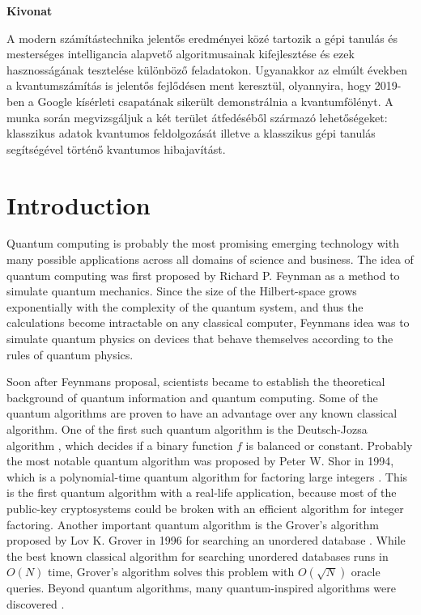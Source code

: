\documentclass[12pt, a4paper,  nobibnotes]{article}
\begin{document}
\begin{center}
    \textbf{Kivonat}\\
    \par A modern számítástechnika jelentős eredményei közé tartozik a gépi
    tanulás és mesterséges intelligancia alapvető algoritmusainak kifejlesztése és ezek 
    hasznosságának tesztelése különböző feladatokon. Ugyanakkor az elmúlt években a 
    kvantumszámítás is jelentős fejlődésen ment keresztül, olyannyira, hogy 2019-ben a Google kísérleti
    csapatának sikerült demonstrálnia a kvantumfölényt. A munka során megvizsgáljuk a két terület átfedéséből 
    származó lehetőségeket: klasszikus adatok kvantumos feldolgozását illetve a klasszikus
    gépi tanulás segítségével történő kvantumos hibajavítást.
\end{center}
\thispagestyle{empty} %
\newpage

\thispagestyle{empty}
\tableofcontents
\newpage

\thispagestyle{empty}
\listoffigures
\newpage

\section{Introduction}
Quantum computing is probably the most promising emerging technology with many possible applications across
all domains of science and business. The idea of quantum computing was first proposed by Richard P. Feynman
as a method to simulate quantum mechanics. Since the size of the Hilbert-space grows exponentially with
the complexity of the quantum system, and thus the calculations become intractable on any classical
computer, Feynmans idea was to simulate quantum physics on devices that behave themselves according to 
the rules of quantum physics.
\par
Soon after Feynmans proposal, scientists became to establish the theoretical background of quantum
information and quantum computing. Some of the quantum algorithms are proven to have an 
advantage over any known classical algorithm. One of the first such quantum algorithm is 
the Deutsch-Jozsa algorithm \cite{DeutschJozsa1992}, which decides if a binary function $f$ 
is balanced or constant. Probably the most notable quantum algorithm was proposed by Peter W. Shor 
in 1994, which is a polynomial-time quantum algorithm for factoring large integers \cite{Shor1994}.
This is the first quantum algorithm with a real-life application, because most of the public-key
cryptosystems could be broken with an efficient algorithm for integer factoring. 
Another important quantum algorithm is the Grover's algorithm proposed by Lov K. Grover in 1996 for
searching an unordered database \cite{Grover1996}. While the best known classical algorithm 
for searching unordered databases runs in $O(N)$ time, Grover's algorithm solves this problem
with $O(\sqrt N)$ oracle queries. Beyond quantum algorithms, many quantum-inspired algorithms were 
discovered \cite{Tang2019,Ding2019QuantumInspiredSVM,ArrazolaQuantumInspired2019}.
\end{document}
